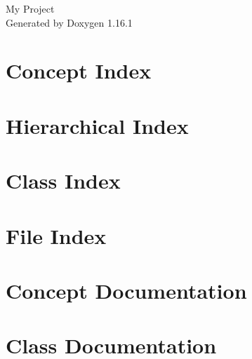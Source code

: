 \documentclass[twoside]{book}
\newcommand{\+}{\discretionary{\mbox{\scriptsize$\hookleftarrow$}}{}{}}
\newcommand{\clearemptydoublepage}{%
    \newpage{\pagestyle{empty}\cleardoublepage}%
  }
\begin{document}
  \raggedbottom
    \hypersetup{pageanchor=false,
                bookmarksnumbered=true,
                pdfencoding=unicode
               }
  \begin{titlepage}
  \vspace*{7cm}
  \begin{center}%
  {\Large My Project}\\
  \vspace*{1cm}
  {\large Generated by Doxygen 1.16.1}\\
  \end{center}
  \end{titlepage}
  \clearemptydoublepage
  \tableofcontents
  \clearemptydoublepage
  \hypersetup{pageanchor=true}
\chapter{Concept Index}

\chapter{Hierarchical Index}

\chapter{Class Index}

\chapter{File Index}

\chapter{Concept Documentation}

\chapter{Class Documentation}










\end{document}
